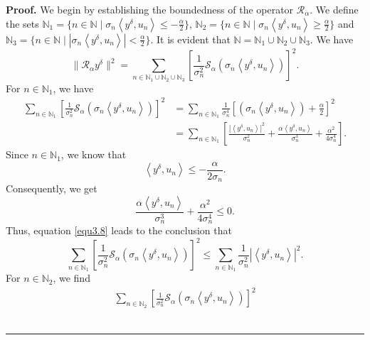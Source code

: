 \documentclass[a4paper,12pt]{article}
\numberwithin{equation}{section}
\newenvironment{proof}[1][Proof]{\textbf{#1.} }
{\ \rule{0.75em}{0.75em}\smallskip}
\begin{document}
\begin{proof}
    We begin by establishing the boundedness of the operator $\mathcal{R}_{\alpha}$. We define the sets $\mathbb{N}_{1}=\{n\in\mathbb{N}\mid\sigma_{n}\left<y^{\delta},u_{n}\right>\leq -\frac{\alpha}{2}\}$, $\mathbb{N}_{2}=\{n\in\mathbb{N}\mid \sigma_{n}\left<y^{\delta},u_{n}\right>\geq \frac{\alpha}{2}\}$ and $\mathbb{N}_{3}=\{n\in\mathbb{N}\mid |\sigma_{n}\left<y^{\delta},u_{n}\right>|<\frac{\alpha}{2}\}$. It is evident that $\mathbb{N}=\mathbb{N}_{1}\cup\mathbb{N}_{2}\cup\mathbb{N}_{3}$. We have  
    \begin{equation*}
        \|\mathcal{R}_{\alpha}y^{\delta}\|^2=\sum_{n\in\mathbb{N}_{1}\cup\mathbb{N}_{2}\cup\mathbb{N}_{3}}\left[\frac{1}{\sigma_{n}^{2}}\mathcal{S}_{\alpha}(\sigma_{n}\left<y^{\delta},u_{n}\right>)\right]^2.
    \end{equation*}
    For $n\in\mathbb{N}_{1}$, we have
    \begin{align}\label{equ3.8}
        \sum_{n\in\mathbb{N}_{1}}\left[\frac{1}{\sigma_{n}^{2}}\mathcal{S}_{\alpha}(\sigma_{n}\left<y^{\delta},u_{n}\right>)\right]^2
        & =\sum_{n\in\mathbb{N}_{1}}\frac{1}{\sigma_{n}^{4}}\left[(\sigma_{n}\left<y^{\delta},u_{n}\right>)+\frac{\alpha}{2}\right]^2 \nonumber\\
        & =\sum_{n\in\mathbb{N}_{1}}\left[\frac{|\left<y^{\delta},u_{n}\right>|^2}{\sigma_{n}^{2}}+\frac{\alpha\left<y^{\delta},u_{n}\right>}{\sigma_{n}^{3}}+\frac{\alpha^{2}}{4\sigma_{n}^4}\right].
    \end{align}
    Since $n\in\mathbb{N}_{1}$, we know that
    \begin{equation*}
        \left<y^{\delta},u_{n}\right>\leq-\frac{\alpha}{2\sigma_{n}}.
    \end{equation*}
    Consequently, we get
    \begin{equation*}
       \frac{\alpha\left<y^{\delta},u_{n}\right>}{\sigma_{n}^{3}}+\frac{\alpha^{2}}{4\sigma_{n}^4}\leq 0.
    \end{equation*}
    Thus, equation \eqref{equ3.8} leads to the conclusion that
    \begin{equation}\label{equ3.9}
        \sum_{n\in\mathbb{N}_{1}}\left[\frac{1}{\sigma_{n}^{2}}\mathcal{S}_{\alpha}(\sigma_{n}\left<y^{\delta},u_{n}\right>)\right]^2 \leq\sum_{n\in\mathbb{N}_{1}}\frac{1}{\sigma_{n}^2}|\left<y^{\delta},u_{n}\right>|^2.
    \end{equation}
    For $n\in\mathbb{N}_{2}$, we find
    \begin{align}\label{equ3.10}
         \sum_{n\in\mathbb{N}_{2}}\left[\frac{1}{\sigma_{n}^{2}}\mathcal{S}_{\alpha}(\sigma_{n}\left<y^{\delta},u_{n}\right>)\right]^2

\end{align}
\end{proof}
\end{document}
